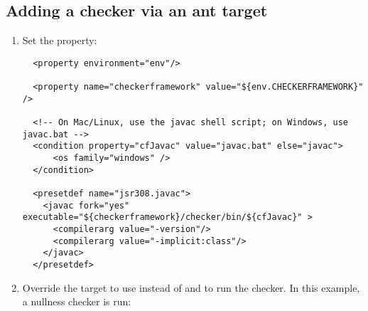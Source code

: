 \subsection {Adding a checker via an ant target\label{netbeans-ant-target}}

\begin{enumerate}
\item
Set the  property:

\begin{smaller}
\begin{Verbatim}
  <property environment="env"/>

  <property name="checkerframework" value="${env.CHECKERFRAMEWORK}" />

  <!-- On Mac/Linux, use the javac shell script; on Windows, use javac.bat -->
  <condition property="cfJavac" value="javac.bat" else="javac">
      <os family="windows" />
  </condition>

  <presetdef name="jsr308.javac">
    <javac fork="yes" executable="${checkerframework}/checker/bin/${cfJavac}" >
      <compilerarg value="-version"/>
      <compilerarg value="-implicit:class"/>
    </javac>
  </presetdef>
\end{Verbatim}
\end{smaller}

\item
Override the  target to
use  instead of  and to run the checker.
In this example, a nullness checker is run:


\end{enumerate}
